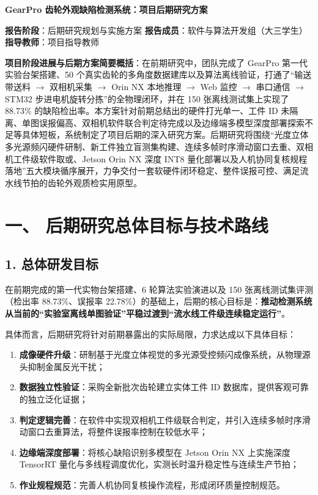 
\begin{center}
{\bfseries GearPro 齿轮外观缺陷检测系统：项目后期研究方案\par}
\end{center}

\vspace{0.6em}
\noindent\textbf{报告阶段}：后期研究规划与实施方案 \hfill
\textbf{报告成员}：软件与算法开发组（大三学生） \hfill
\textbf{指导教师}：项目指导教师 \par
\vspace{0.8em}

\textbf{项目阶段进展与后期方案简要概括}：在前期研究中，团队完成了 GearPro 第一代实验台架搭建、50 个真实齿轮的多角度数据建库以及算法离线验证，打通了“输送带送料 $\rightarrow$ 双相机采集 $\rightarrow$ Orin NX 本地推理 $\rightarrow$ Web 监控 $\rightarrow$ 串口通信 $\rightarrow$ STM32 步进电机旋转分拣”的全物理闭环，并在 150 张离线测试集上实现了 88.73\% 的缺陷检出率。本方案针对前期总结出的硬件打光单一、工件 ID 未隔离、单图误报偏高、双相机软件联合判定待完成以及边缘端多模型深度部署探索不足等具体短板，系统制定了项目后期的深入研究方案。后期研究将围绕“光度立体多光源频闪硬件研制、新工件独立盲测集构建、连续多帧时序滑动窗口去重、双相机工件级软件取或、Jetson Orin NX 深度 INT8 量化部署以及人机协同复核规程落地”五大模块循序展开，力争交付一套软硬件闭环稳定、整件误报可控、满足流水线节拍的齿轮外观质检实用原型。

\section*{一、 后期研究总体目标与技术路线}

\subsection*{1. 总体研发目标}
在前期完成的第一代实物台架搭建、6 轮算法实验演进以及 150 张离线测试集评测（检出率 88.73\%、误报率 22.78\%）的基础上，后期的核心目标是：\textbf{推动检测系统从当前的“实验室离线单图验证”平稳过渡到“流水线工件级连续稳定运行”}。

具体而言，后期研究将针对前期暴露出的实际局限，力求达成以下具体目标：
\begin{enumerate}
    \item \textbf{成像硬件升级}：研制基于光度立体视觉的多光源受控频闪成像系统，从物理源头抑制金属反光干扰；
    \item \textbf{数据独立性验证}：采购全新批次齿轮建立实体工件 ID 数据库，提供客观可靠的独立泛化证据；
    \item \textbf{判定逻辑完善}：在软件中实现双相机工件级联合判定，并引入连续多帧时序滑动窗口去重算法，将整件误报率控制在较低水平；
    \item \textbf{边缘端深度部署}：将核心缺陷识别多模型在 Jetson Orin NX 上实施深度 TensorRT 量化与多线程调度优化，实测长时温升稳定性与连续生产节拍；
    \item \textbf{作业规程规范}：完善人机协同复核操作流程，形成闭环质量控制规范。
\end{enumerate}

